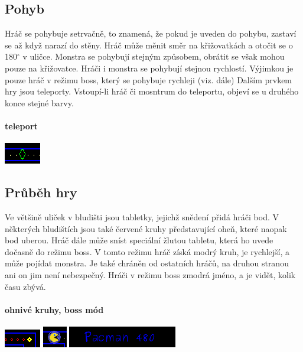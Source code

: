 \documentclass[10pt,a4paper]{article}
\begin{document}
\subsection{Pohyb}
Hráč se pohybuje setrvačně, to znamená, že pokud je uveden do pohybu, zastaví se až když narazí do stěny.
Hráč může měnit směr na křižovatkách a otočit se o 180$^{\circ}$ v uličce.
Monstra se pohybují stejným způsobem, obrátit se však mohou pouze na křižovatce.
Hráči i monstra se pohybují stejnou rychlostí. Výjimkou je pouze hráč v režimu boss, který se pohybuje rychleji (viz. dále)
Dalším prvkem hry jsou teleporty. Vstoupí-li hráč či mosntrum do teleportu, objeví se u druhého konce stejné barvy.
\paragraph{teleport}
\begin{center}
\includegraphics[scale=0.7]{images/port.png}
\end{center}
\subsection{Průběh hry}
Ve většině uliček v bludišti jsou tabletky, jejichž snědení přidá hráči bod. V některých bludištích jsou také červené kruhy představující oheň, které naopak bod uberou. Hráč dále může sníst speciální žlutou tabletu, která ho uvede dočasně do režimu boss. V tomto režimu hráč získá modrý kruh, je rychlejší, a může pojídat monstra. Je také chráněn od ostatních hráčů, na druhou stranou ani on jim není nebezpečný.
Hráči v režimu boss zmodrá jméno, a je vidět, kolik času zbývá.
\paragraph{ohnivé kruhy, boss mód}
\begin{center}
\includegraphics[scale=0.7]{images/example.png}
\includegraphics[scale=0.7]{images/boss.png}
\includegraphics[scale=0.7]{images/boss_name.png}
\end{center}
\end{document}
